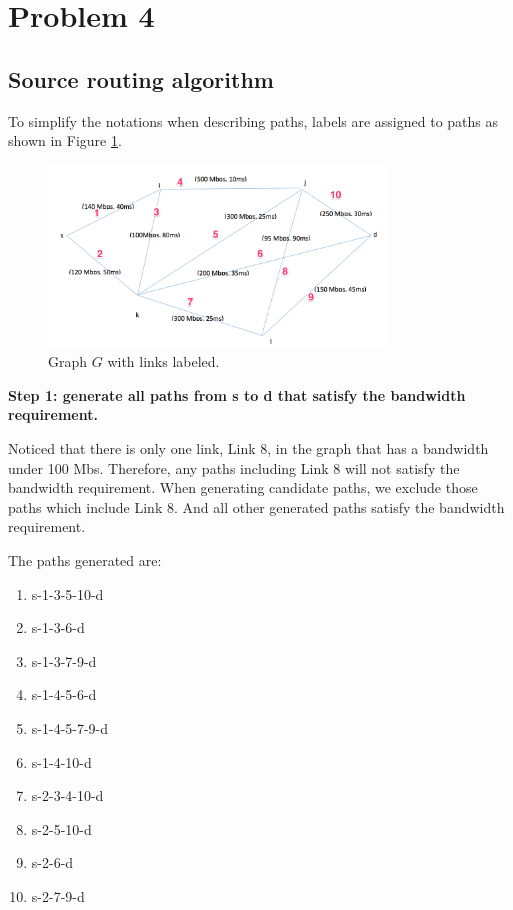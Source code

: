 \section{Problem 4}
\subsection{Source routing algorithm}

To simplify the notations when describing paths, labels are assigned to paths as shown in Figure \ref{fig:graph}.

\begin{figure}[h]
    \centering
    \includegraphics[width=0.8\textwidth]{labeled.png}
    \caption{Graph $G$ with links labeled.}
    \label{fig:graph}
\end{figure}

\textbf{Step 1: generate all paths from s to d that satisfy the bandwidth requirement.}

Noticed that there is only one link, Link 8, in the graph that has a bandwidth under 100 Mbs. Therefore, any paths including Link 8 will not satisfy the bandwidth requirement. When generating candidate paths, we exclude those paths which include Link 8. And all other generated paths satisfy the bandwidth requirement.

The paths generated are:
\begin{enumerate}
\item s-1-3-5-10-d
\item s-1-3-6-d
\item s-1-3-7-9-d
\item s-1-4-5-6-d
\item s-1-4-5-7-9-d
\item s-1-4-10-d
\item s-2-3-4-10-d
\item s-2-5-10-d
\item s-2-6-d
\item s-2-7-9-d
\end{enumerate}

